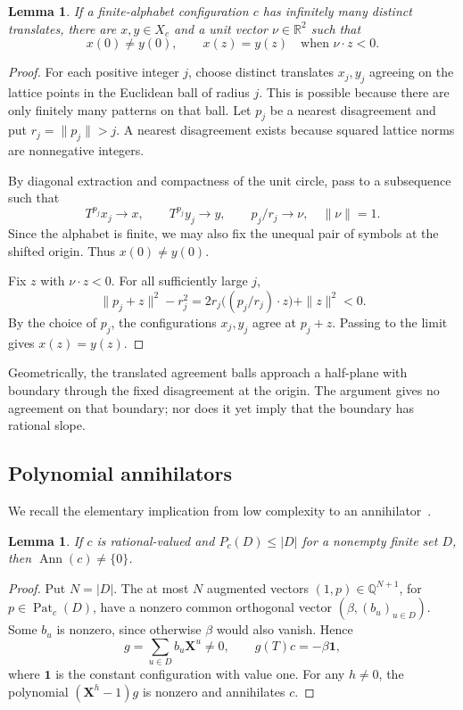 \documentclass[11pt,a4paper,reqno]{amsart}
\newtheorem{lemma}[theorem]{Lemma}
\theoremstyle{remark}
\newcommand{\Q}{\mathbb Q}
\newcommand{\R}{\mathbb R}
\newcommand{\mon}[1]{\boldsymbol X^{#1}}
\DeclareMathOperator{\Ann}{Ann}
\DeclareMathOperator{\Pat}{Pat}
\numberwithin{equation}{section}
\begin{document}
\begin{lemma}\label{lem:halfplane-pair}
If a finite-alphabet configuration $c$ has infinitely many distinct translates, there are $x,y\in X_c$ and a unit vector $\nu\in\R^2$ such that
\begin{equation}\label{eq:halfplane-pair}
 x(0)\ne y(0),\qquad x(z)=y(z)\quad\text{when }\nu\cdot z<0.
\end{equation}
\end{lemma}
\begin{proof}
For each positive integer $j$, choose distinct translates $x_j,y_j$ agreeing on the lattice points in the Euclidean ball of radius $j$. This is possible because there are only finitely many patterns on that ball. Let $p_j$ be a nearest disagreement and put $r_j=\|p_j\|>j$. A nearest disagreement exists because squared lattice norms are nonnegative integers.

By diagonal extraction and compactness of the unit circle, pass to a subsequence such that
\[
 T^{p_j}x_j\longrightarrow x,\qquad
 T^{p_j}y_j\longrightarrow y,\qquad
 p_j/r_j\longrightarrow\nu,\quad \|\nu\|=1.
\]
Since the alphabet is finite, we may also fix the unequal pair of symbols at the shifted origin. Thus $x(0)\ne y(0)$.

Fix $z$ with $\nu\cdot z<0$. For all sufficiently large $j$,
\[
 \|p_j+z\|^2-r_j^2
 =2r_j\bigl((p_j/r_j)\cdot z\bigr)+\|z\|^2<0.
\]
By the choice of $p_j$, the configurations $x_j,y_j$ agree at $p_j+z$. Passing to the limit gives $x(z)=y(z)$.
\end{proof}

Geometrically, the translated agreement balls approach a half-plane with boundary through the fixed disagreement at the origin. The argument gives no agreement on that boundary; nor does it yet imply that the boundary has rational slope.

\subsection{Polynomial annihilators}
We recall the elementary implication from low complexity to an annihilator~\cite[Lemma~5]{KS}.

\begin{lemma}\label{lem:ann-exists}
If $c$ is rational-valued and $P_c(D)\le|D|$ for a nonempty finite set $D$, then $\Ann(c)\ne\{0\}$.
\end{lemma}
\begin{proof}
Put $N=|D|$. The at most $N$ augmented vectors $(1,p)\in\Q^{N+1}$, for $p\in\Pat_c(D)$, have a nonzero common orthogonal vector $(\beta,(b_u)_{u\in D})$. Some $b_u$ is nonzero, since otherwise $\beta$ would also vanish. Hence
\[
 g=\sum_{u\in D}b_u\mon u\ne0,
 \qquad g(T)c=-\beta\mathbf1,
\]
where $\mathbf1$ is the constant configuration with value one. For any $h\ne0$, the polynomial $(\mon h-1)g$ is nonzero and annihilates $c$.
\end{proof}
\end{document}
